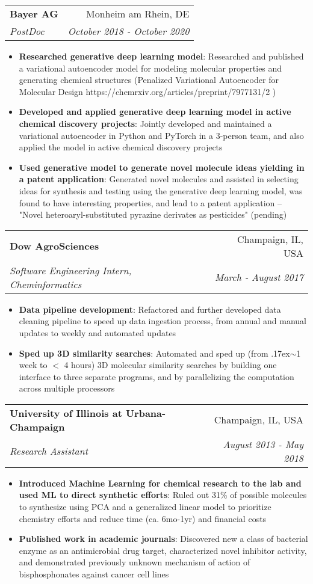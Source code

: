 \documentclass[letterpaper,hidelinks,11pt]{article}
\makeatletter
\newcommand{\resumeItem}[2]{
  \item\small{
    \textbf{#1}{: #2 \vspace{-2pt}}
  }
}
\newcommand{\resumeSubheading}[4]{
  \vspace{-1pt}\item
    \begin{tabular*}{0.97\textwidth}{l@{\extracolsep{\fill}}r}
      \textbf{#1} & #2 \\
      \textit{\small#3} & \textit{\small #4} \\
    \end{tabular*}\vspace{-5pt}
}
\newcommand{\resumeItemListStart}{\begin{itemize}}
\newcommand{\resumeItemListEnd}{\end{itemize}\vspace{-5pt}}
\makeatother
\begin{document}
 \resumeSubheading
 {Bayer AG}{Monheim am Rhein, DE}
 {PostDoc}{October 2018 - October 2020}
  \resumeItemListStart
  	\resumeItem{Researched generative deep learning model}
	{Researched and published a variational autoencoder model for modeling molecular properties and generating chemical structures (Penalized Variational Autoencoder for Molecular Design https://chemrxiv.org/articles/preprint/7977131/2 )}
	\resumeItem{Developed and applied generative deep learning model in active chemical discovery projects}
	{Jointly developed and maintained a variational autoencoder in Python and PyTorch in a 3-person team, and also applied the model in active chemical discovery projects}
	\resumeItem{Used generative model to generate novel molecule ideas yielding in a patent application}
		{Generated novel molecules and assisted in selecting ideas for synthesis and testing using the generative deep learning model, was found to have interesting properties, and lead to a patent application -- "Novel heteroaryl-substituted pyrazine derivates as pesticides" (pending)}
  \resumeItemListEnd

    \resumeSubheading
      {Dow AgroSciences }{Champaign, IL, USA}
      {Software Engineering Intern, Cheminformatics}{March - August 2017}
      \resumeItemListStart
        \resumeItem{Data pipeline development}
          {Refactored and further developed data cleaning pipeline to speed up data ingestion process, from annual and manual updates to weekly and automated updates}
        \resumeItem{Sped up 3D similarity searches}
          {Automated and sped up (from {\raise.17ex\hbox{$\scriptstyle\mathtt{\sim}$}}1 week to $<$ 4 hours) 3D molecular similarity searches by building one interface to three separate programs, and by parallelizing the computation across multiple processors}
        \resumeItemListEnd

    \resumeSubheading
        {University of Illinois at Urbana-Champaign }{Champaign, IL, USA}
        {Research Assistant}{August 2013 - May 2018}
        \resumeItemListStart
          \resumeItem{Introduced Machine Learning for chemical research to the lab and used ML to direct synthetic efforts}
            {Ruled out 31\% of possible molecules to synthesize using PCA and a generalized linear model to prioritize chemistry efforts and reduce time (ca. 6mo-1yr) and financial costs }
          \resumeItem{Published work in academic journals}
            {Discovered new a class of bacterial enzyme as an antimicrobial drug target, characterized novel inhibitor activity, and demonstrated previously unknown mechanism of action of bisphosphonates against cancer cell lines}
        \resumeItemListEnd
\end{document}

